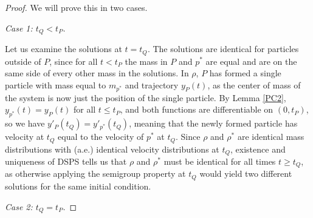 \documentclass[11pt]{article}
\numberwithin{equation}{section}
\begin{document}
    \begin{proof}
        We will prove this in two cases.
        
        {\textit{Case 1: $t_Q < t_P$.}}
        
        Let us examine the solutions at $t=t_Q$. The solutions are identical for particles outside of $P$, since for all $t<t_P$ the mass in $P$ and $p^*$ are equal and are on the same side of every other mass in the solutions. In $\rho$, $P$ has formed a single particle with mass equal to $m_{p^*}$ and trajectory $y_P(t)$, as the center of mass of the system is now just the position of the single particle. By Lemma \ref{PC2}, $y_{p^*}(t)=y_P(t)$ for all $t \le t_P$, and both functions are differentiable on $(0,t_P)$, so we have $y'_P(t_Q)=y'_{p^*}(t_Q)$, meaning that the newly formed particle has velocity at $t_Q$ equal to the velocity of $p^*$ at $t_Q$. Since $\rho$ and $\rho^*$ are identical mass distributions with (a.e.) identical velocity distributions at $t_Q$, existence and uniqueness of DSPS tells us that $\rho$ and $\rho^*$ must be identical for all times $t \ge t_Q$, as otherwise applying the semigroup property at $t_Q$ would yield two different solutions for the same initial condition.
        
        {\textit{Case 2: $t_Q = t_P$.}}
        

\end{proof}
\end{document}
